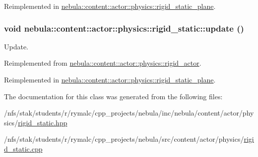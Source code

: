 Reimplemented in \hyperlink{classnebula_1_1content_1_1actor_1_1physics_1_1rigid__static__plane_aeb2d9144ad76f92c6170bbc5ad81c2d6}{nebula::content::actor::physics::rigid\_\-static\_\-plane}.\hypertarget{classnebula_1_1content_1_1actor_1_1physics_1_1rigid__static_a8ecc4b9b308562ab3942bdac5b8ddfea}{
\subsubsection[{update}]{\setlength{\rightskip}{0pt plus 5cm}void nebula::content::actor::physics::rigid\_\-static::update ()}}
\label{classnebula_1_1content_1_1actor_1_1physics_1_1rigid__static_a8ecc4b9b308562ab3942bdac5b8ddfea}


Update. 

Reimplemented from \hyperlink{classnebula_1_1content_1_1actor_1_1physics_1_1rigid__actor_a9227091110aae435ca13493edd27fe66}{nebula::content::actor::physics::rigid\_\-actor}.

Reimplemented in \hyperlink{classnebula_1_1content_1_1actor_1_1physics_1_1rigid__static__plane_ab42f682ba60457dc596613690b57517e}{nebula::content::actor::physics::rigid\_\-static\_\-plane}.

The documentation for this class was generated from the following files:\begin{DoxyCompactItemize}
\item 
/nfs/stak/students/r/rymalc/cpp\_\-projects/nebula/inc/nebula/content/actor/physics/\hyperlink{physics_2rigid__static_8hpp}{rigid\_\-static.hpp}\item 
/nfs/stak/students/r/rymalc/cpp\_\-projects/nebula/src/content/actor/physics/\hyperlink{physics_2rigid__static_8cpp}{rigid\_\-static.cpp}\end{DoxyCompactItemize}
